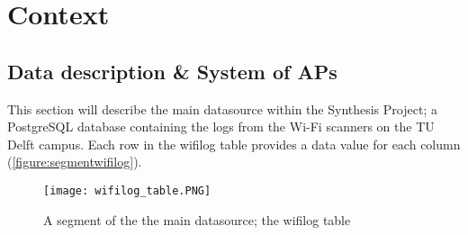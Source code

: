\chapter{Context}\label{entrances} 
\section{Data description \& System of APs}\label{datadescription}
This section will describe the main datasource within the Synthesis Project; a PostgreSQL database containing the logs from the Wi-Fi scanners on the TU Delft campus. Each row in the wifilog table provides a data value for each column (\autoref{figure:segmentwifilog}).

\begin{figure}[H]
	\centering
	\texttt{[image: wifilog\_table.PNG]}
	\captionsetup{justification=centering}
	\caption{A segment of the the main datasource; the wifilog table}
	\label{figure:segmentwifilog}
\end{figure}

